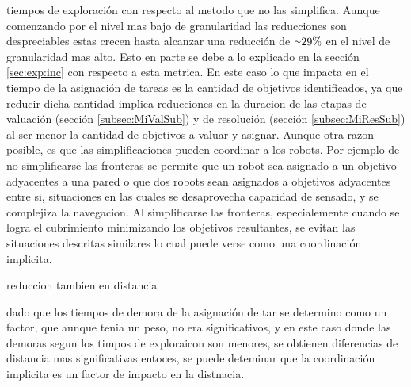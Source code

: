 tiempos de exploración con respecto al metodo que no las simplifica. Aunque
comenzando por el nivel mas bajo de granularidad las reducciones son
despreciables estas crecen hasta alcanzar una reducción de ${\smallsim}29\%$ en
el nivel de granularidad mas alto. Esto en parte se debe a lo explicado en la
sección \ref{sec:exp:inc} con respecto a esta metrica. En este caso lo que
impacta en el tiempo de la asignación de tareas es la cantidad de objetivos
identificados, ya que reducir dicha cantidad implica reducciones en la duracion
de las etapas de valuación (sección \ref{subsec:MiValSub}) y de resolución
(sección \ref{subsec:MiResSub}) al ser menor la cantidad de objetivos a valuar
y asignar. Aunque otra razon posible, es que las simplificaciones pueden
coordinar a los robots. Por ejemplo de no simplificarse las fronteras se
permite que un robot sea asignado a un objetivo adyacentes a una pared o que
dos robots sean asignados a objetivos adyacentes entre si, situaciones en las
cuales se desaprovecha capacidad de sensado, y se complejiza la navegacion. Al
simplificarse las fronteras, especialemente cuando se logra el cubrimiento
minimizando los objetivos resultantes, se evitan las situaciones descritas
similares lo cual puede verse como una coordinación implicita.


reduccion tambien en distancia

dado que los tiempos de demora de la asignación de tar se determino como un factor, que aunque tenia un peso, no era significativos, y en este caso donde las demoras segun los timpos de exploraicon son menores, se obtienen diferencias de distancia mas significativas entoces, se puede deteminar que la coordinación implicita es un factor de impacto en la distnacia.




